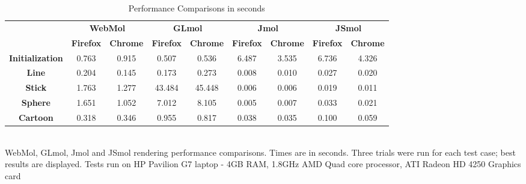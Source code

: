 \documentclass[]{bioinfo}
\begin{document}
\begin{table}[h]
\caption{Performance Comparisons in seconds}
\begin{tabular}{ccccccccc}
\multicolumn{1}{l}{}    & \multicolumn{2}{c}{\textbf{WebMol}}                        & \multicolumn{2}{c}{\textbf{GLmol}}                           & \multicolumn{2}{c}{\textbf{Jmol}}                          & \multicolumn{2}{c}{\textbf{JSmol}}              \\
\multicolumn{1}{l}{}    & \textbf{Firefox}              & \textbf{Chrome}            & \textbf{Firefox}               & \textbf{Chrome}             & \textbf{Firefox}              & \textbf{Chrome}            & \textbf{Firefox}              & \textbf{Chrome} \\
\textbf{Initialization} & \cellcolor[HTML]{C0C0C0}0.763 & \multicolumn{1}{c|}{0.915} & \cellcolor[HTML]{C0C0C0}0.507  & \multicolumn{1}{c|}{0.536}  & \cellcolor[HTML]{C0C0C0}6.487 & \multicolumn{1}{c|}{3.535} & \cellcolor[HTML]{C0C0C0}6.736 & 4.326           \\
\textbf{Line}           & \cellcolor[HTML]{C0C0C0}0.204 & \multicolumn{1}{c|}{0.145} & \cellcolor[HTML]{C0C0C0}0.173  & \multicolumn{1}{c|}{0.273}  & \cellcolor[HTML]{C0C0C0}0.008 & \multicolumn{1}{c|}{0.010} & \cellcolor[HTML]{C0C0C0}0.027 & 0.020           \\
\textbf{Stick}          & \cellcolor[HTML]{C0C0C0}1.763 & \multicolumn{1}{c|}{1.277} & \cellcolor[HTML]{C0C0C0}43.484 & \multicolumn{1}{c|}{45.448} & \cellcolor[HTML]{C0C0C0}0.006 & \multicolumn{1}{c|}{0.006} & \cellcolor[HTML]{C0C0C0}0.019 & 0.011           \\
\textbf{Sphere}         & \cellcolor[HTML]{C0C0C0}1.651 & \multicolumn{1}{c|}{1.052} & \cellcolor[HTML]{C0C0C0}7.012  & \multicolumn{1}{c|}{8.105}  & \cellcolor[HTML]{C0C0C0}0.005 & \multicolumn{1}{c|}{0.007} & \cellcolor[HTML]{C0C0C0}0.033 & 0.021           \\
\textbf{Cartoon}        & \cellcolor[HTML]{C0C0C0}0.318 & \multicolumn{1}{c|}{0.346} & \cellcolor[HTML]{C0C0C0}0.955  & \multicolumn{1}{c|}{0.817}  & \cellcolor[HTML]{C0C0C0}0.038 & \multicolumn{1}{c|}{0.035} & \cellcolor[HTML]{C0C0C0}0.100 & 0.059          
\end{tabular}
\\[1.5pt]
WebMol, GLmol, Jmol and JSmol rendering performance comparisons.  Times are in seconds.  Three trials were run for each test case; best results are displayed.  Tests run on HP Pavilion G7 laptop - 4GB RAM, 1.8GHz AMD Quad core processor, ATI Radeon HD 4250 Graphics card
\label{my-label}
\end{table}
\end{document}
